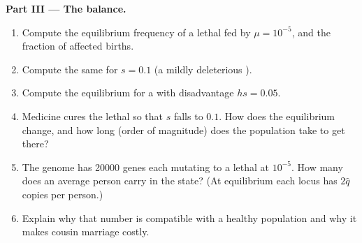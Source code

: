 \begin{problem}
\medskip
\noindent\textbf{Part III --- The balance.}
\begin{enumerate}[resume]
  \item Compute the equilibrium frequency of a  lethal fed
        by $\mu = 10^{-5}$, and the fraction of affected births.
  \item Compute the same for $s = 0.1$ (a mildly deleterious
        ).
  \item Compute the equilibrium for a   with
         disadvantage $hs = 0.05$.
  \item Medicine cures the lethal so that $s$ falls to $0.1$. How
        does the equilibrium change, and how long (order of
        magnitude) does the population take to get there?
  \item The genome has \num{20000} genes each mutating to a
         lethal at $10^{-5}$. How many  does an
        average person carry in the  state? (At
        equilibrium each locus has $2\hat q$ copies per person.)
  \item Explain why that number is compatible with a healthy
        population and why it makes cousin marriage costly.
\end{enumerate}


\end{problem}
